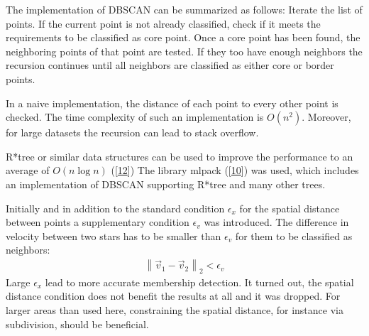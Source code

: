 \documentclass[letterpaper,10pt,english]{sphinxmanual}
\begin{document}
\sphinxAtStartPar
The implementation of DBSCAN can be summarized as follows: Iterate the list of points. If the current point is not already classified, check if it meets the requirements to be classified as core point.
Once a core point has been found, the neighboring points of that point are tested. If they too have enough neighbors the recursion continues until all neighbors are classified as either core or border points.

\sphinxAtStartPar
In a naive implementation, the distance of each point to every other point is checked. The time complexity of such an implementation is \(O(n^2)\).
Moreover, for large datasets the recursion can lead to stack overflow.

\sphinxAtStartPar
R*\sphinxhyphen{}tree or similar data structures can be used to improve the performance to an average of \(O(n\log{n})\) ({[}\hyperlink{cite.NBodySimulation/Appendix:id33}{12}{]})
The library mlpack ({[}\hyperlink{cite.NBodySimulation/Appendix:id34}{10}{]}) was used, which includes an implementation of DBSCAN supporting R*\sphinxhyphen{}tree and many other trees.

\sphinxAtStartPar
Initially and in addition to the standard condition \(\epsilon_{x}\) for the spatial distance between points a supplementary condition \(\epsilon_{v}\) was introduced.
The difference in velocity between two stars has to be smaller than \(\epsilon_{v}\) for them to be classified as neighbors:
\begin{equation*}
\begin{split}\left \|\vec{v}_{1}-\vec{v}_{2}  \right \|_{2}< \epsilon_{v}\end{split}
\end{equation*}
\sphinxAtStartPar
Large \(\epsilon_{x}\) lead to more accurate membership detection. It turned out, the spatial distance condition does not benefit the results at all and it was dropped.
For larger areas than used here, constraining the spatial distance, for instance via subdivision, should be beneficial.
\end{document}
